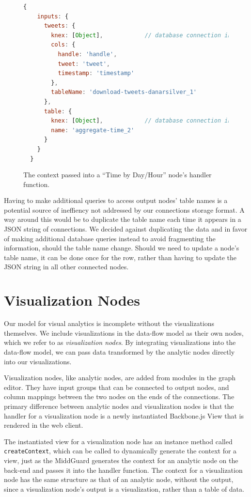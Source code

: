 \documentclass[midd]{thesis}
\begin{document}
\begin{figure}
  \begin{lstlisting}[language=javascript, gobble=2]
  {
    inputs: {
      tweets: {
        knex: [Object],            // database connection instance
        cols: {
          handle: 'handle',
          tweet: 'tweet',
          timestamp: 'timestamp'
        },
        tableName: 'download-tweets-danarsilver_1'
      },
      table: {
        knex: [Object],            // database connection instance
        name: 'aggregate-time_2'
      }
    }
  }
  \end{lstlisting}
  \caption{The context passed into a ``Time by Day/Hour'' node's handler
  function.}
  \label{lst:nodecontext}
\end{figure}

Having to make additional queries to access output nodes' table names is a
potential source of ineffiency not addressed by our connections storage format.
A way around this would be to duplicate the table name each time it appears in a
JSON string of connections. We decided against duplicating the data and in favor
of making additional database queries instead to avoid fragmenting the
information, should the table name change. Should we need to update a node's
table name, it can be done once for the row, rather than having to update the
JSON string in all other connected nodes.

\section{Visualization Nodes}

Our model for visual analytics is incomplete without the visualizations
themselves. We include visualizations in the data-flow model as their own nodes,
which we refer to as \textit{visualization nodes}. By integrating visualizations
into the data-flow model, we can pass data transformed by the analytic nodes
directly into our visualizations.

Visualization nodes, like analytic nodes, are added from modules in the graph
editor. They have input groups that can be connected to output nodes, and column
mappings between the two nodes on the ends of the connections. The primary
difference between analytic nodes and visualization nodes is that the handler
for a visualization node is a newly instantiated Backbone.js View
\cite{backbone} that is rendered in the web client.

The instantiated view for a visualization node has an instance method called\\
\texttt{createContext}, which can be called to dynamically generate the context
for a view, just as the MiddGuard generates the context for an analytic node on
the back-end and passes it into the handler function. The context for a
visualization node has the same structure as that of an analytic node, without
the output, since a visualization node's output is a visualization, rather than
a table of data.
\end{document}
